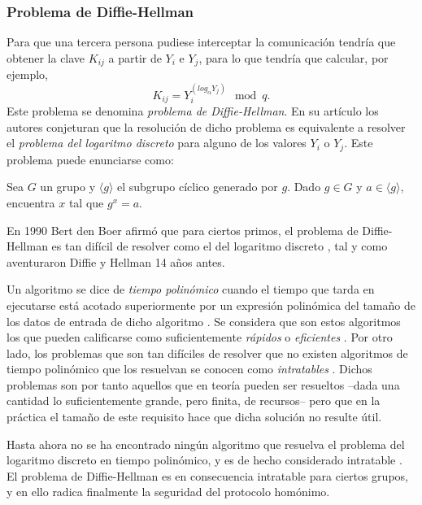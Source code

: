 \documentclass[
  a4paper,
  12pt,
  spanish,
]{scrartcl}
\begin{document}
\subsubsection{Problema de Diffie-Hellman}

Para que una tercera persona pudiese interceptar la comunicación tendría que obtener la clave \(K_{ij}\) a partir de \(Y_i\) e \(Y_j\), para lo que tendría que calcular, por ejemplo, \[K_{ij} = Y_i^{\left(log_{\alpha} Y_j\right)} \mod q.\]
Este problema se denomina \textit{problema de Diffie-Hellman}.
En su artículo los autores conjeturan que la resolución de dicho problema es equivalente a resolver el \textit{problema del logaritmo discreto} para alguno de los valores \(Y_i\) o \(Y_j\). Este problema puede enunciarse como: \begin{displayquote}
  Sea \(G\) un grupo y \(\langle g \rangle\) el subgrupo cíclico generado por \(g\). Dado \(g \in G\) y \(a \in \langle g \rangle\), encuentra \(x\) tal que \(g^x = a\).
\end{displayquote}
En 1990 Bert den Boer afirmó que para ciertos primos, el problema de Diffie-Hellman es tan difícil de resolver como el del logaritmo discreto \parencite{goos_diffie-hellman_1990}, tal y como aventuraron Diffie y Hellman 14 años antes.

Un algoritmo se dice de \textit{tiempo polinómico} cuando el tiempo que tarda en ejecutarse está acotado superiormente por un expresión polinómica del tamaño de los datos de entrada de dicho algoritmo \parencite[6]{garey_computers_1979}. Se considera que son estos algoritmos los que pueden calificarse como suficientemente \textit{rápidos} o \textit{eficientes} \parencite[33]{goldreich_computational_2008}.
Por otro lado, los problemas que son tan difíciles de resolver que no existen algoritmos de tiempo polinómico que los resuelvan se conocen como \textit{intratables} \parencite[8]{garey_computers_1979}.
Dichos problemas son por tanto aquellos que en teoría pueden ser resueltos --dada una cantidad lo suficientemente grande, pero finita, de recursos-- pero que en la práctica el tamaño de este requisito hace que dicha solución no resulte útil.

Hasta ahora no se ha encontrado ningún algoritmo que resuelva el problema del logaritmo discreto en tiempo polinómico, y es de hecho considerado intratable \parencite{rueppel_how_1993}.
El problema de Diffie-Hellman es en consecuencia intratable para ciertos grupos, y en ello radica finalmente la seguridad del protocolo homónimo.
\end{document}
